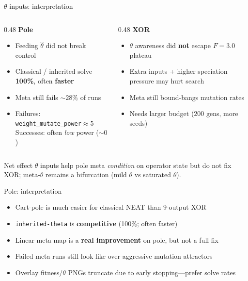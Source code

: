 \documentclass[aspectratio=169,11pt]{beamer}
\begin{document}
\begin{frame}{$\theta$ inputs: interpretation}
  \begin{columns}[t]
    \begin{column}{0.48\textwidth}
      \textbf{Pole}
      \begin{itemize}
        \item Feeding $\hat\theta$ did not break control
        \item Classical / inherited solve \textbf{100\%}, often \textbf{faster}
        \item Meta still fails $\sim 28\%$ of runs
        \item Failures: \texttt{weight\_mutate\_power}${}\approx 5$\\
          Successes: often \emph{low} power ($\sim 0$)
      \end{itemize}
    \end{column}
    \begin{column}{0.48\textwidth}
      \textbf{XOR}
      \begin{itemize}
        \item $\theta$ awareness did \textbf{not} escape $F=3.0$ plateau
        \item Extra inputs + higher speciation pressure may hurt search
        \item Meta still bound-bangs mutation rates
        \item Needs larger budget ($200$ gens, more seeds)
      \end{itemize}
    \end{column}
  \end{columns}

  \vspace{0.8em}
  \begin{block}{Net effect}
    $\theta$ inputs help pole meta \emph{condition} on operator state but do not fix
    XOR; meta-$\theta$ remains a bifurcation (mild $\theta$ vs saturated $\theta$).
  \end{block}
\end{frame}

\begin{frame}{Pole: interpretation}
  \begin{itemize}
    \item Cart-pole is much easier for classical NEAT than 9-output XOR
    \item \texttt{inherited-theta} is \textbf{competitive} (100\%; often faster)
    \item Linear meta map is a \textbf{real improvement} on pole, but not a full fix
    \item Failed meta runs still look like over-aggressive mutation attractors
    \item Overlay fitness/$\theta$ PNGs truncate due to early stopping---prefer solve rates
  \end{itemize}
\end{frame}
\end{document}
